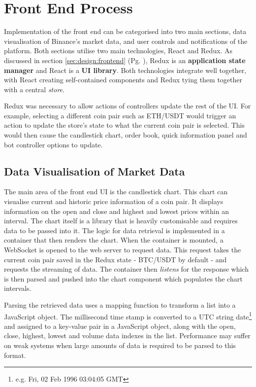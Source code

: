 \section{Front End Process}
\label{sec:implementation:frontend}

\noindent Implementation of the front end can be categorised into two main sections, data visualisation of Binance's market data, and user controls and notifications of the platform. Both sections utilise two main technologies, React and Redux. As discussed in section \ref{sec:design:frontend} (Pg. \pageref{sec:design:frontend}), Redux is an \textbf{application state manager} and React is a \textbf{UI library}. Both technologies integrate well together, with React creating self-contained components and Redux tying them together with a central \textit{store}.

Redux was necessary to allow actions of controllers update the rest of the UI. For example, selecting a different coin pair such as ETH/USDT would trigger an action to update the store's state to what the current coin pair is selected. This would then cause the candlestick chart, order book, quick information panel and bot controller options to update. 

\subsection{Data Visualisation of Market Data}
\label{sec:implementation:frontend:data_vis}
\noindent The main area of the front end UI is the candlestick chart. This chart can visualise current and historic price information of a coin pair. It displays information on the open and close and highest and lowest prices within an interval. The chart itself is a library that is heavily customisable and requires data to be passed into it. The logic for data retrieval is implemented in a container that then renders the chart. When the container is mounted, a WebSocket is opened to the web server to request data. This request takes the current coin pair saved in the Redux state - BTC/USDT by default - and requests the streaming of data. The container then \textit{listens} for the response which is then parsed and pushed into the chart component which populates the chart intervals.

Parsing the retrieved data uses a mapping function to transform a list into a JavaScript object. The millisecond time stamp is converted to a UTC string date\footnote{e.g. Fri, 02 Feb 1996 03:04:05 GMT} and assigned to a key-value pair in a JavaScript object, along with the open, close, highest, lowest and volume data indexes in the list. Performance may suffer on weak systems when large amounts of data is required to be parsed to this format. 

